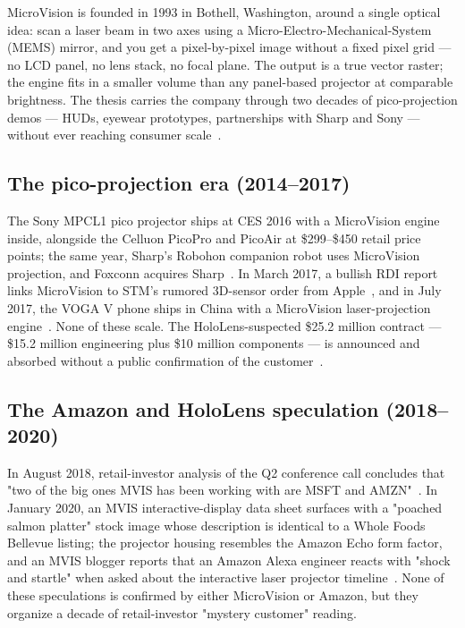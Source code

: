 \documentclass[10pt,letterpaper,twocolumn]{article}
\begin{document}
MicroVision is founded in 1993 in Bothell, Washington, around a single optical idea: scan a laser beam in two axes using a Micro-Electro-Mechanical-System (MEMS) mirror, and you get a pixel-by-pixel image without a fixed pixel grid --- no LCD panel, no lens stack, no focal plane. The output is a true vector raster; the engine fits in a smaller volume than any panel-based projector at comparable brightness. The thesis carries the company through two decades of pico-projection demos --- HUDs, eyewear prototypes, partnerships with Sharp and Sony --- without ever reaching consumer scale~\citep{microvision2026site}.

\subsection{The pico-projection era (2014--2017)}

The Sony MPCL1 pico projector ships at CES 2016 with a MicroVision engine inside, alongside the Celluon PicoPro and PicoAir at \$299--\$450 retail price points; the same year, Sharp's Robohon companion robot uses MicroVision projection, and Foxconn acquires Sharp~\citep{scudder2016ces,scudder2016q4}. In March 2017, a bullish RDI report links MicroVision to STM's rumored 3D-sensor order from Apple~\citep{scudder2017rdi}, and in July 2017, the VOGA V phone ships in China with a MicroVision laser-projection engine~\citep{scudder2017voga}. None of these scale. The HoloLens-suspected \$25.2 million contract --- \$15.2 million engineering plus \$10 million components --- is announced and absorbed without a public confirmation of the customer~\citep{scudder2018q2,scudder2019pps}.

\subsection{The Amazon and HoloLens speculation (2018--2020)}

In August 2018, retail-investor analysis of the Q2 conference call concludes that "two of the big ones MVIS has been working with are MSFT and AMZN"~\citep{scudder2018q2}. In January 2020, an MVIS interactive-display data sheet surfaces with a "poached salmon platter" stock image whose description is identical to a Whole Foods Bellevue listing; the projector housing resembles the Amazon Echo form factor, and an MVIS blogger reports that an Amazon Alexa engineer reacts with "shock and startle" when asked about the interactive laser projector timeline~\citep{scudder2020amazon}. None of these speculations is confirmed by either MicroVision or Amazon, but they organize a decade of retail-investor "mystery customer" reading.
\end{document}
